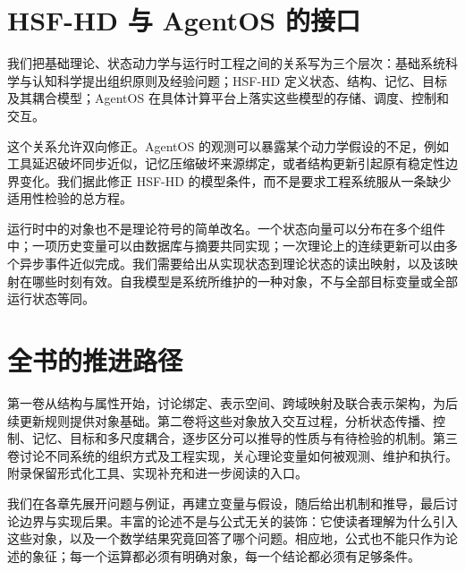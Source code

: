 \section*{HSF-HD 与 AgentOS 的接口}
我们把基础理论、状态动力学与运行时工程之间的关系写为三个层次：基础系统科学与认知科学提出组织原则及经验问题；HSF-HD 定义状态、结构、记忆、目标及其耦合模型；AgentOS 在具体计算平台上落实这些模型的存储、调度、控制和交互。

这个关系允许双向修正。AgentOS 的观测可以暴露某个动力学假设的不足，例如工具延迟破坏同步近似，记忆压缩破坏来源绑定，或者结构更新引起原有稳定性边界变化。我们据此修正 HSF-HD 的模型条件，而不是要求工程系统服从一条缺少适用性检验的总方程。

运行时中的对象也不是理论符号的简单改名。一个状态向量可以分布在多个组件中；一项历史变量可以由数据库与摘要共同实现；一次理论上的连续更新可以由多个异步事件近似完成。我们需要给出从实现状态到理论状态的读出映射，以及该映射在哪些时刻有效。自我模型是系统所维护的一种对象，不与全部目标变量或全部运行状态等同。

\section*{全书的推进路径}
第一卷从结构与属性开始，讨论绑定、表示空间、跨域映射及联合表示架构，为后续更新规则提供对象基础。第二卷将这些对象放入交互过程，分析状态传播、控制、记忆、目标和多尺度耦合，逐步区分可以推导的性质与有待检验的机制。第三卷讨论不同系统的组织方式及工程实现，关心理论变量如何被观测、维护和执行。附录保留形式化工具、实现补充和进一步阅读的入口。

我们在各章先展开问题与例证，再建立变量与假设，随后给出机制和推导，最后讨论边界与实现后果。丰富的论述不是与公式无关的装饰：它使读者理解为什么引入这些对象，以及一个数学结果究竟回答了哪个问题。相应地，公式也不能只作为论述的象征；每一个运算都必须有明确对象，每一个结论都必须有足够条件。
